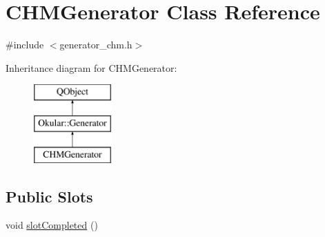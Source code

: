 \hypertarget{classCHMGenerator}{\section{C\+H\+M\+Generator Class Reference}
\label{classCHMGenerator}
}


{\ttfamily \#include $<$generator\+\_\+chm.\+h$>$}

Inheritance diagram for C\+H\+M\+Generator\+:\begin{figure}[H]
\begin{center}
\leavevmode
\includegraphics[height=3.000000cm]{classCHMGenerator}
\end{center}
\end{figure}
\subsection*{Public Slots}
\begin{DoxyCompactItemize}
\item 
void \hyperlink{classCHMGenerator_a238973cd7c98434b97af498d121f16a5}{slot\+Completed} ()
\end{DoxyCompactItemize}
